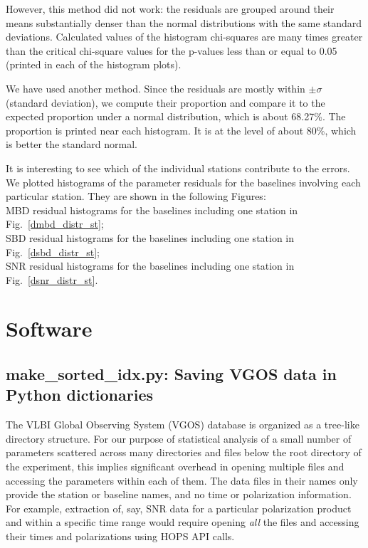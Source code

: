 \documentclass[letterpaper,twoside,12pt]{article}
\begin{document}
However, this method did not work: the residuals are grouped around their means substantially denser than the normal distributions with the same standard deviations. Calculated values of the histogram chi-squares are many times greater than the critical chi-square values for the p-values less than or equal to 0.05 (printed in each of the histogram plots). 

We have used another method. Since the residuals are mostly within $\pm \sigma$ (standard deviation), we  compute their proportion and compare it to the expected proportion under a normal distribution, which is about 68.27\%. The proportion is printed near each histogram. It is at the level of about 80\%, which is better the standard normal.

It is interesting to see which of the individual stations contribute to the errors. We plotted histograms of the parameter residuals for the baselines involving each particular station. They are shown in the following Figures: \\

\indent MBD residual histograms for the baselines including one station in Fig.~\ref{dmbd_distr_st};  \\
\indent SBD residual histograms for the baselines including one station in Fig.~\ref{dsbd_distr_st};  \\
\indent SNR residual histograms for the baselines including one station in Fig.~\ref{dsnr_distr_st}.  \\

 

\section{Software}

\subsection{make\_sorted\_idx.py: Saving VGOS data in Python dictionaries}

The VLBI Global Observing System (VGOS) database is organized as a tree-like directory structure. For our purpose of statistical analysis of a small number of parameters scattered across many directories and files below the root directory of the experiment, this implies significant overhead in opening multiple files and accessing the parameters within each of them. The data files in their names only provide the station or baseline names, and no time or polarization information. For example, extraction of, say, SNR data for a particular polarization product and within a specific time range would require opening \emph{all} the files and accessing their times and polarizations using HOPS API calls.
\end{document}
